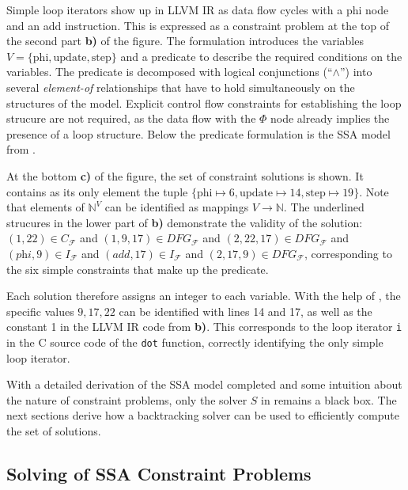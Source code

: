     Simple loop iterators show up in LLVM IR as data flow cycles with a phi node
    and an add instruction.
    This is expressed as a constraint problem at the top of the second part
    {\bf b)} of the figure.
    The formulation introduces the variables
    $V=\{\text{phi}, \text{update}, \text{step}\}$ and a predicate to
    describe the required conditions on the variables.
    The predicate is decomposed with logical conjunctions (``$\land$'') into
    several {\em element-of} relationships that have to hold simultaneously on
    the structures of the model.
    Explicit control flow constraints for establishing the loop strucure are not
    required, as the data flow with the $\Phi$ node already implies the presence
    of a loop structure.
    Below the predicate formulation is the SSA model from
    .

    At the bottom {\bf c)} of the figure, the set of constraint solutions is
    shown.
    It contains as its only element the tuple
    $\{\text{phi}\mapsto6,\text{update}\mapsto14,\text{step}\mapsto19\}$.
    Note that elements of $\mathbb N^V$ can be identified as mappings
    $V\rightarrow\mathbb N$.
    The underlined strucures in the lower part of
     {\bf b)} demonstrate the validity of the
    solution:
    $(1,22)\in C_\mathcal F$ and $(1,9,17)\in DFG_\mathcal F$ and
    $(2,22,17)\in DFG_\mathcal F$ and $(\textit{phi},9)\in I_\mathcal F$ and
    $(\textit{add},17)\in I_\mathcal F$ and $(2,17,9)\in DFG_\mathcal F$,
    corresponding to the six simple constraints that make up the predicate.

    Each solution therefore assigns an integer to each variable.
    With the help of , the specific values $9,17,22$
    can be identified with lines 14 and 17, as well as the constant 1 in the
    LLVM IR code from  {\bf b)}.
    This corresponds to the loop iterator \texttt{i} in the C source code of the
    \texttt{dot} function, correctly identifying the only simple loop iterator.

    With a detailed derivation of the SSA model completed and some intuition
    about the nature of constraint problems, only the solver $S$ in
     remains a black box.
    The next sections derive how a backtracking solver can
    be used to efficiently compute the set of solutions.

\subsection{Solving of SSA Constraint Problems}

